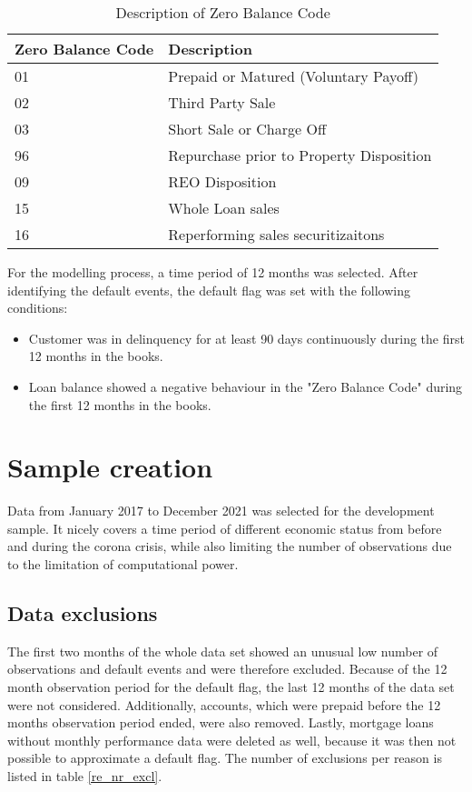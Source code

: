 \begin{table}[h!]
\centering
\begin{tabular}{ l l }\toprule
\textbf{Zero Balance Code} & \textbf{Description}            \\\midrule
01                & Prepaid or Matured (Voluntary Payoff)    \\
02                & Third Party Sale                         \\
03                & Short Sale or Charge Off                 \\
96                & Repurchase prior to Property Disposition \\
09                & REO Disposition                          \\
15                & Whole Loan sales                         \\
16                & Reperforming sales securitizaitons \\\bottomrule
\end{tabular}%
\caption{Description of Zero Balance Code}
\label{tab:re_ZB_Descr}
\end{table}

For the modelling process, a time period of 12 months was selected. After identifying the default events, the default flag was set with the following conditions:

\begin{itemize}
  \item Customer was in delinquency for at least 90 days continuously during the first 12 months in the books.
  \item Loan balance showed a negative behaviour in the "Zero Balance Code" during the first 12 months in the books.
\end{itemize}

\section{Sample creation}

Data from January 2017 to December 2021 was selected for the development sample. It nicely covers a time period of different economic status from before and during the corona crisis, while also limiting the number of observations due to the limitation of computational power. 

\subsection{Data exclusions}
The first two months of the whole data set showed an unusual low number of observations and default events and were therefore excluded. Because of the 12 month observation period for the default flag, the last 12 months of the data set were not considered. Additionally, accounts, which were prepaid before the 12 months observation period ended, were also removed. Lastly, mortgage loans without monthly performance data were deleted as well, because it was then not possible to approximate a default flag. The number of exclusions per reason is listed in table \ref{re_nr_excl}. 

